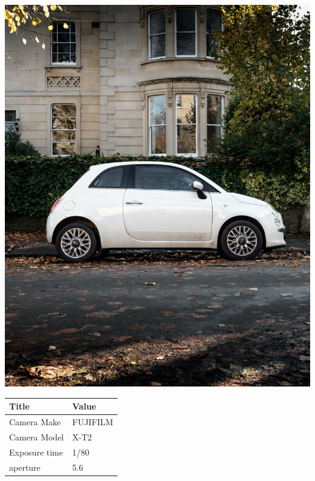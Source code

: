 \documentclass[twocolumn]{article}
\begin{document}
\begin{center}
\includegraphics[width=0.7\columnwidth]{Image7}
\newline
\newline
\newline
\newline
\newline
\begin{tabular}{| m{3cm} | m{3cm} |}
\hline

Title  &  Value   \\

\hline
Camera Make  & FUJIFILM   \\
\hline
Camera Model  & X-T2   \\
\hline
Exposure time  & 1/80  \\
\hline
aperture & 5.6 \\
\hline


\end{tabular}


\end{center}

\pagebreak
\end{document}
